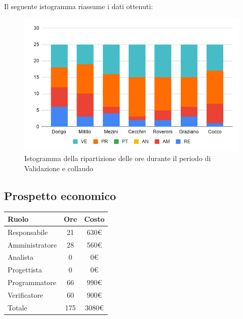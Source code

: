 {{{{{{{{{Il seguente istogramma riassume i dati ottenuti:
\begin{figure}[!ht]
	\begin{center}
		\includegraphics[width=0.8\linewidth]{../immagini/pdp/istogramma_validazione.png}
		\caption{Istogramma della ripartizione delle ore durante il periodo di Validazione e
			collaudo}
	\end{center}
\end{figure}

\subsection{Prospetto economico}\label{PreventivoPreventivoFaseDiProgettazionediValidazioneECollaudoProspettoEconomico}
\quad
\def\tabularxcolumn#1{m{#1}}
{	
	\begin{center}
		\renewcommand{\arraystretch}{1.4}
		\begin{tabularx}{7cm}{|X|c|c|}
			\hline
			\rowcolor{airforceblue}
			\textbf{Ruolo} & \textbf{Ore} & \textbf{Costo}\\
			\hline
			Responsabile & 21 & 630\euro\\
			\hline
			Amministratore & 28 & 560\euro\\
			\hline
			Analista & 0 & 0\euro\\
			\hline
			Progettista & 0 & 0\euro\\
			\hline
			Programmatore & 66 & 990\euro\\
			\hline
			Verificatore & 60 & 900\euro\\
			\hline
			Totale & 175 & 3080\euro\\
			\hline
		\end{tabularx}
	\end{center}

}}}}}}}}}}
